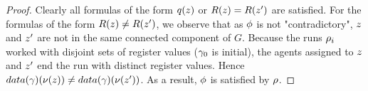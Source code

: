 \begin{proof}
	
	Clearly all formulas of the form $q(\varz)$ or $R(\varz) = R(\varz')$ are satisfied.
	For the formulas of the form $R(\varz) \neq R(\varz')$, we observe that as $\phi$ is not "contradictory", $\varz$ and $\varz'$ are not in the same connected component of $G$. Because the runs $\rho_i$ worked with disjoint sets of register values ($\gamma_0$ is initial), the agents assigned to $\varz$ and $\varz'$ end the run with distinct register values.
	Hence $\data{\config}(\nu(\varz)) \neq \data{\config}(\nu(\varz'))$. As a result, $\phi$ is satisfied by $\rho$.
\end{proof}
\fi